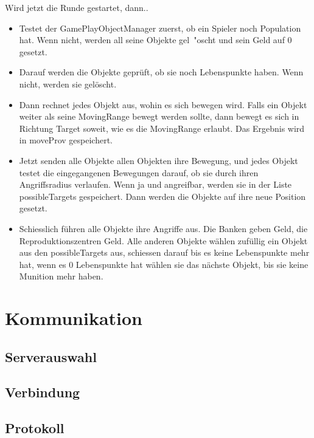 \documentclass[ngerman, 12pt, pdftex]{scrartcl}[2006/07/30]
\begin{document}
Wird jetzt die Runde gestartet, dann..
\begin{itemize}

\item Testet der GamePlayObjectManager zuerst, ob ein Spieler noch Population hat. Wenn nicht, werden all seine Objekte gel\ "{o}scht und sein Geld auf 0 gesetzt.
\item Darauf werden die Objekte gepr\"{u}ft, ob sie noch Lebenspunkte haben. Wenn nicht, werden sie gel\"{o}scht.
\item Dann rechnet jedes Objekt aus, wohin es sich bewegen wird. Falls ein Objekt weiter als seine MovingRange bewegt werden sollte, dann bewegt es sich in Richtung Target soweit, wie es die MovingRange erlaubt. Das Ergebnis wird in moveProv gespeichert.
\item Jetzt senden alle Objekte allen Objekten ihre Bewegung, und jedes Objekt testet die eingegangenen Bewegungen darauf, ob sie durch ihren Angriffsradius verlaufen. Wenn ja und angreifbar, werden sie in der Liste possibleTargets gespeichert. Dann werden die Objekte auf ihre neue Position gesetzt.
\item Schiesslich f\"{u}hren alle Objekte ihre Angriffe aus. Die Banken geben Geld, die Reproduktionszentren Geld. Alle anderen Objekte w\"{a}hlen zuf\"{u}llig ein Objekt aus den possibleTargets aus, schiessen darauf bis es keine Lebenspunkte mehr hat, wenn es 0 Lebenspunkte hat w\"{a}hlen sie das n\"{a}chste Objekt, bis sie keine Munition mehr haben.
\end{itemize}



\section{Kommunikation}
\subsection{Serverauswahl}


\subsection{Verbindung}


\subsection{Protokoll}
\end{document}
